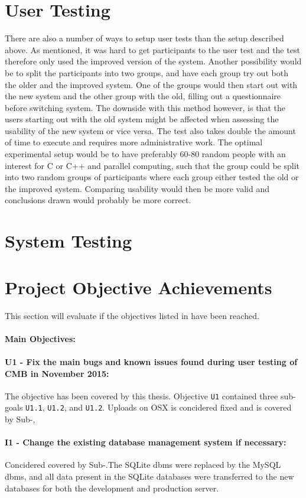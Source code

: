 \section{User Testing}
\label{sec:eval-user-testing}
There are also a number of ways to setup user tests than the setup described above. As mentioned, it was hard to get participants to the user test and the test therefore only used the improved version of the system. Another possibility would be to split the participants into two groups, and have each group try out both the older and the improved system. One of the groups would then start out with the new system and the other group with the old, filling out a questionnaire before switching system. The downside with this method however, is that the users starting out with the old system might be affected when assessing the usability of the new system or vice versa. The test also takes double the amount of time to execute and requires more administrative work. The optimal experimental setup would be to have preferably 60-80 random people with an interest for C or C++ and parallel computing, such that the group could be split into two random groups of participants where each group either tested the old or the improved system. Comparing usability would then be more valid and conclusions drawn would probably be more correct.

\section{System Testing}
\label{sec:eval-sys-testing}

\section{Project Objective Achievements}
\label{sec:eval-pr-achiev}
This section will evaluate if the objectives listed in  have been reached.

\paragraph*{Main Objectives:} \hfill

\paragraph*{U1 - Fix the main bugs and known issues found during user testing of CMB in November 2015:} The objective has been covered by this thesis. Objective \texttt{U1} contained three sub-goals \texttt{U1.1}, \texttt{U1.2}, and \texttt{U1.2}. Uploads on OSX is concidered fixed and is covered by Sub-\Cref{},

\paragraph*{I1 - Change the existing database management system if necessary:} Concidered covered by Sub-.The SQLite \gls{dbms} were replaced by the MySQL \gls{dbms}, and all data present in the SQLite databases were transferred to the new databases for both the development and production server.
